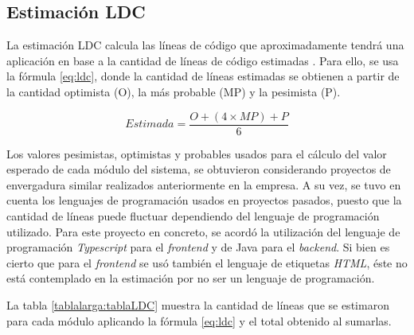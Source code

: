 \documentclass[pdftex,11pt,a4paper]{book}
\begin{document}
\vspace{-8mm}
\subsection{Estimación LDC}


La estimación LDC calcula las líneas de código que aproximadamente tendrá una aplicación en base a la cantidad de líneas de código estimadas \cite{bib:cocomoClase}. Para ello, se usa la fórmula \ref{eq:ldc}, donde la cantidad de líneas estimadas se obtienen a partir de la cantidad optimista (O), la más probable (MP) y la pesimista (P). 

\vspace{-5mm}

\begin{equation}
Estimada = \frac{O + (4 \times MP) + P}{6} 
\label{eq:ldc}
\end{equation}

Los valores pesimistas, optimistas y probables usados para el cálculo del valor esperado de cada módulo del sistema, se obtuvieron considerando proyectos de envergadura similar realizados anteriormente en la empresa. A su vez, se tuvo en cuenta los lenguajes de programación usados en proyectos pasados, puesto que la cantidad de líneas puede fluctuar dependiendo del lenguaje de programación utilizado. Para este proyecto en concreto, se acordó la utilización del lenguaje de programación \textit{Typescript} para el \textit{frontend} y de Java para el \textit{backend}. Si bien es cierto que para el \textit{frontend} se usó también el lenguaje de etiquetas \textit{HTML}, éste no está contemplado en la estimación por no ser un lenguaje de programación. 

La tabla \ref{tablalarga:tablaLDC} muestra la cantidad de líneas que se estimaron para cada módulo aplicando la fórmula \ref{eq:ldc} y el total obtenido al sumarlas.

\renewcommand{\tablename}{Tabla}

\renewcommand{\arraystretch}{1,7}
\end{document}
